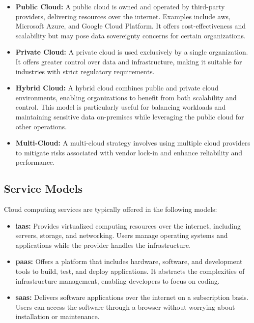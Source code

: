 \begin{itemize}
	\item \textbf{Public Cloud:} A public cloud is owned and operated by third-party providers, delivering resources over the internet. Examples include \gls{aws}, Microsoft Azure, and Google Cloud Platform. It offers cost-effectiveness and scalability but may pose data sovereignty concerns for certain organizations.
	\item \textbf{Private Cloud:} A private cloud is used exclusively by a single organization. It offers greater control over data and infrastructure, making it suitable for industries with strict regulatory requirements.
	\item \textbf{Hybrid Cloud:} A hybrid cloud combines public and private cloud environments, enabling organizations to benefit from both scalability and control. This model is particularly useful for balancing workloads and maintaining sensitive data on-premises while leveraging the public cloud for other operations.
	\item \textbf{Multi-Cloud:} A multi-cloud strategy involves using multiple cloud providers to mitigate risks associated with vendor lock-in and enhance reliability and performance.
\end{itemize}

\subsection{Service Models}

Cloud computing services are typically offered in the following models:

\begin{itemize}
	\item \textbf{\gls{iaas}:} Provides virtualized computing resources over the internet, including servers, storage, and networking. Users manage operating systems and applications while the provider handles the infrastructure.
	\item \textbf{\gls{paas}:} Offers a platform that includes hardware, software, and development tools to build, test, and deploy applications. It abstracts the complexities of infrastructure management, enabling developers to focus on coding.
	\item \textbf{\gls{saas}:} Delivers software applications over the internet on a subscription basis. Users can access the software through a browser without worrying about installation or maintenance.
\end{itemize}
